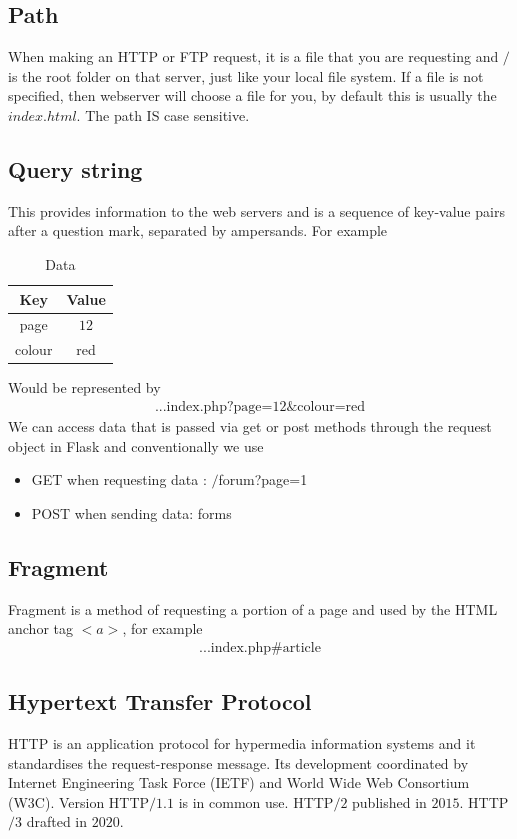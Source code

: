 \documentclass[a4paper]{article}
\theoremstyle{plain}
\theoremstyle{definition}
\theoremstyle{remark}
\begin{document}
\begin{flushleft}
\subsection{Path}
When making an HTTP or FTP request, it is a file that you are requesting and $\slash$ is the root folder on that server, just like your local file system. If a file is not specified, then webserver will choose a file for you, by default this is usually the $index.html$. The path IS case sensitive.
\subsection{Query string}
This provides information to the web servers and is a sequence of key-value pairs after a question mark, separated by ampersands. For example
\begin{table}[H]
	\centering
	\caption{Data}
	\label{tab:data}
	\begin{tabular}{|c|c|}
		\hline
	Key & Value\\
	\hline
	page & $12$ \\
	colour & red\\
	\hline
	\end{tabular}
\end{table}
	Would be represented by
	\begin{align*}
		\text{...index.php?page=12\&colour=red}
	\end{align*}
	We can access data that is passed via get or post methods through the request object in Flask and conventionally we use
	\begin{itemize}
		\item GET when requesting data : $\slash$forum?page=1
		\item POST when sending data: forms
	\end{itemize}
	\subsection{Fragment}
	Fragment is a method of requesting a portion of a page and used by the HTML anchor tag $<a>$, for example
	\begin{align*}
		\text{...index.php\#article}
	\end{align*}
	\subsection{Hypertext Transfer Protocol}
	HTTP is an application protocol for hypermedia information systems and it standardises the request-response message. Its development coordinated by Internet Engineering Task Force (IETF) and World Wide Web Consortium (W3C). Version HTTP$\slash 1.1$ is in common use. HTTP$\slash2$ published in $2015$. HTTP$\slash3$ drafted in $2020$.

\end{flushleft}
\end{document}
